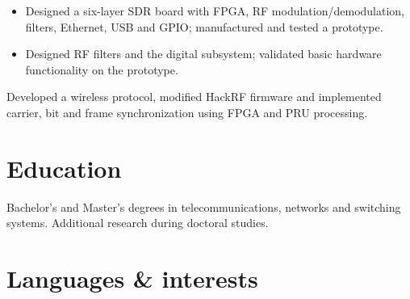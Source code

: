 \documentclass[10pt,a4paper]{article}
\begin{document}
\begin{itemize}
  \item Designed a six-layer SDR board with FPGA, RF modulation/demodulation,
    filters, Ethernet, USB and GPIO; manufactured and tested a prototype.
  \item Designed RF filters and the digital subsystem; validated basic
    hardware functionality on the prototype.
\end{itemize}

Developed a wireless protocol, modified HackRF firmware and implemented
carrier, bit and frame synchronization using FPGA and PRU processing.

\section*{Education}
Bachelor's and Master's degrees in telecommunications, networks and switching
systems. Additional research during doctoral studies.

\section*{Languages \& interests}
\end{document}

